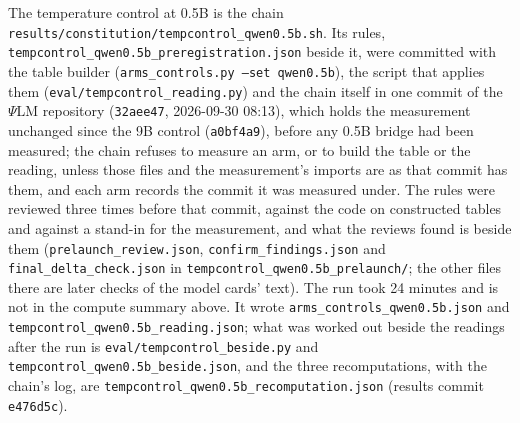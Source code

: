 \documentclass[11pt]{article}
\newcommand{\psilm}{$\Psi$LM}
\newcommand{\code}[1]{\texttt{#1}}
\begin{document}
\begin{sloppypar}
The temperature control at 0.5B is the chain
\code{results/\allowbreak{}constitution/\allowbreak{}tempcontrol\_\allowbreak{}qwen0.5b.sh}. Its rules,
\code{tempcontrol\_\allowbreak{}qwen0.5b\_\allowbreak{}preregistration.json} beside it, were committed with
the table builder (\code{arms\_\allowbreak{}controls.py --set qwen0.5b}), the
script that applies them (\code{eval/\allowbreak{}tempcontrol\_\allowbreak{}reading.py}) and the chain
itself in one commit of the \psilm{} repository (\code{32aee47}, 2026-09-30 08:13),
which holds the measurement unchanged since the 9B control (\code{a0bf4a9}),
before any 0.5B bridge had been measured; the chain refuses to measure an arm, or
to build the table or the reading, unless those files and the measurement's
imports are as that commit has them, and each arm records the commit it was
measured under. The rules were reviewed three times before that commit, against
the code on constructed tables and against a stand-in for the measurement, and
what the reviews found is beside them
(\code{prelaunch\_\allowbreak{}review.json}, \code{confirm\_\allowbreak{}findings.json} and
\code{final\_\allowbreak{}delta\_\allowbreak{}check.json} in
\code{tempcontrol\_\allowbreak{}qwen0.5b\_\allowbreak{}prelaunch/}; the other files there are
later checks of the model cards' text). The run took 24 minutes and is not in the
compute summary above. It wrote
\code{arms\_\allowbreak{}controls\_\allowbreak{}qwen0.5b.json} and
\code{tempcontrol\_\allowbreak{}qwen0.5b\_\allowbreak{}reading.json}; what was worked out beside the
readings after the run is \code{eval/\allowbreak{}tempcontrol\_\allowbreak{}beside.py} and
\code{tempcontrol\_\allowbreak{}qwen0.5b\_\allowbreak{}beside.json}, and the three recomputations, with
the chain's log, are \code{tempcontrol\_\allowbreak{}qwen0.5b\_\allowbreak{}recomputation.json}
(results commit \code{e476d5c}).


\end{sloppypar}
\end{document}
